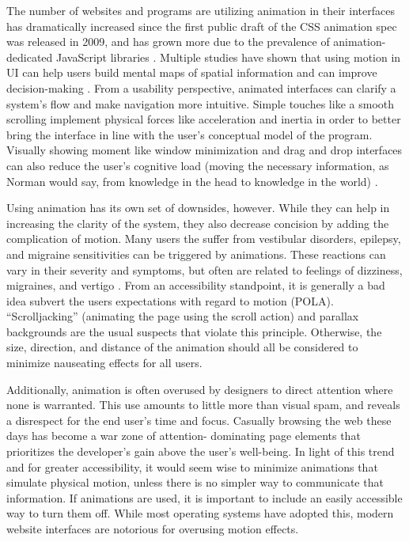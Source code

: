 \documentclass[12pt, oneside]{article}
\begin{document}
The number of websites and programs are utilizing animation in their interfaces has dramatically increased since the first public draft of the CSS animation spec was released in 2009, and has grown more due to the prevalence of animation-dedicated JavaScript libraries \cite{trends}. Multiple studies have shown that using motion in UI can help users build mental maps of spatial information and can improve decision-making \cite{bederson_boltman_1999} \cite{gonzalez_1996}. From a usability perspective, animated interfaces can clarify a system's flow and make navigation more intuitive. Simple touches like a smooth scrolling implement physical forces like acceleration and inertia in order to better bring the interface in line with the user's conceptual model of the program. Visually showing moment like window minimization and drag and drop interfaces can also reduce the user's cognitive load (moving the necessary information, as Norman would say, from knowledge in the head to knowledge in the world) \cite[p.~74]{norman_2013}.

Using animation has its own set of downsides, however. While they can help in increasing the clarity of the system, they also decrease concision by adding the complication of motion. Many users the suffer from vestibular disorders, epilepsy, and migraine sensitivities can be triggered by animations. These reactions can vary in their severity and symptoms, but often are related to feelings of dizziness, migraines, and vertigo \cite{head_2015}. From an accessibility standpoint, it is generally a bad idea subvert the users expectations with regard to motion (POLA). ``Scrolljacking'' (animating the page using the scroll action) and parallax backgrounds are the usual suspects that violate this principle. Otherwise, the size, direction, and distance of the animation should all be considered to minimize nauseating effects for all users.

Additionally, animation is often overused by designers to direct attention where none is warranted. This use amounts to little more than visual spam, and reveals a disrespect for the end user's time and focus. Casually browsing the web these days has become a war zone of attention- dominating page elements that prioritizes the developer's gain above the user's well-being. In light of this trend and for greater accessibility, it would seem wise to minimize animations that simulate physical motion, unless there is no simpler way to communicate that information. If animations are used, it is important to include an easily accessible way to turn them off. While most operating systems have adopted this, modern website interfaces are notorious for overusing motion effects.
\end{document}
